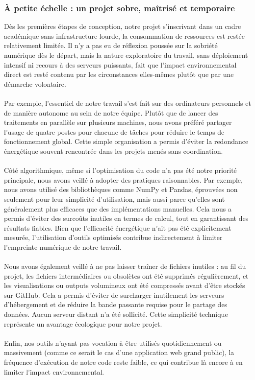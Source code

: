 \documentclass[12pt]{article}
\begin{document}
\subsubsection*{À petite échelle : un projet sobre, maîtrisé et temporaire}
Dès les premières étapes de conception, notre projet s’inscrivant dans un cadre académique sans infrastructure lourde, la consommation de ressources est restée relativement limitée. Il n’y a pas eu de réflexion poussée sur la sobriété numérique dès le départ, mais la nature exploratoire du travail, sans déploiement intensif ni recours à des serveurs puissants, fait que l’impact environnemental direct est resté contenu par les circonstances elles-mêmes plutôt que par une démarche volontaire.\\
\\
Par exemple, l’essentiel de notre travail s’est fait sur des ordinateurs personnels et de manière autonome au sein de notre équipe. Plutôt que de lancer des traitements en parallèle sur plusieurs machines, nous avons préféré partager l’usage de quatre postes pour chacune de tâches pour réduire le temps de fonctionnement global. Cette simple organisation a permis d’éviter la redondance énergétique souvent rencontrée dans les projets menés sans coordination.\\
\\
Côté algorithmique, même si l’optimisation du code n’a pas été notre priorité principale, nous avons veillé à adopter des pratiques raisonnables. Par exemple, nous avons utilisé des bibliothèques comme NumPy et Pandas, éprouvées non seulement pour leur simplicité d’utilisation, mais aussi parce qu’elles sont généralement plus efficaces que des implémentations manuelles. Cela nous a permis d’éviter des surcoûts inutiles en termes de calcul, tout en garantissant des résultats fiables. Bien que l’efficacité énergétique n’ait pas été explicitement mesurée, l’utilisation d’outils optimisés contribue indirectement à limiter l’empreinte numérique de notre travail.\\
\\
Nous avons également veillé à ne pas laisser traîner de fichiers inutiles : au fil du projet, les fichiers intermédiaires ou obsolètes ont été supprimés régulièrement, et les visualisations ou outputs volumineux ont été compressés avant d’être stockés sur GitHub. Cela a permis d’éviter de surcharger inutilement les serveurs d’hébergement et de réduire la bande passante requise pour le partage des données. Aucun serveur distant n’a été sollicité. Cette simplicité technique représente un avantage écologique pour notre projet.\\
\\
Enfin, nos outils n’ayant pas vocation à être utilisés quotidiennement ou massivement (comme ce serait le cas d’une application web grand public), la fréquence d’exécution de notre code reste faible, ce qui contribue là encore à en limiter l’impact environnemental.
\end{document}
